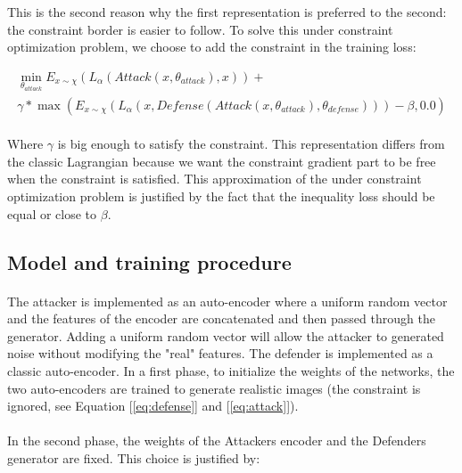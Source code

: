 \documentclass[12pt]{article}
\begin{document}
This is the second reason why the first representation is preferred to the second: the constraint border is easier to follow.
To solve this under constraint optimization problem, we choose to add the constraint in the training loss:

\begin{equation}\label{eq:loss}
\begin{multlined}
\min_{\theta_{attack}} E_{x \sim \chi}(L_{\alpha}(Attack(x, \theta_{attack}), x)) + \\ \gamma * \max( E_{x \sim \chi}(L_{\alpha}(x, Defense(Attack(x, \theta_{attack}), \theta_{defense}))) - \beta, 0.0)
\end{multlined}
\end{equation}

\paragraph{}
Where $\gamma$ is big enough to satisfy the constraint. This representation differs from the classic Lagrangian because we want the constraint gradient part to be free when the constraint is satisfied. This approximation of the under constraint optimization problem is justified by the fact that the inequality loss should be equal or close to $\beta$.

\subsection{Model and training procedure}
\paragraph{}
The attacker is implemented as an auto-encoder where a uniform random vector and the features of the encoder are concatenated and then passed through the generator. Adding a uniform random vector will allow the attacker to generated noise without modifying the "real" features. The defender is implemented as a classic auto-encoder. In a first phase, to initialize the weights of the networks, the two auto-encoders are trained to generate realistic images (the constraint is ignored, see Equation [\ref{eq:defense}] and [\ref{eq:attack}]).

\paragraph{}
In the second phase, the weights of the Attackers encoder and the Defenders generator are fixed. This choice is justified by:
\end{document}
